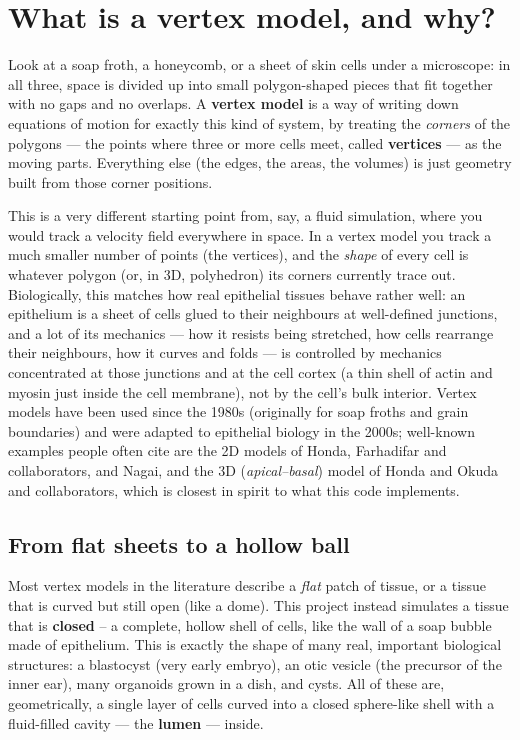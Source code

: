 \documentclass[11pt,a4paper]{report}
\begin{document}
\section{What is a vertex model, and why?}

Look at a soap froth, a honeycomb, or a sheet of skin cells under a
microscope: in all three, space is divided up into small polygon-shaped
pieces that fit together with no gaps and no overlaps. A \textbf{vertex
model} is a way of writing down equations of motion for exactly this
kind of system, by treating the \emph{corners} of the polygons --- the
points where three or more cells meet, called \textbf{vertices} --- as
the moving parts. Everything else (the edges, the areas, the volumes)
is just geometry built from those corner positions.

This is a very different starting point from, say, a fluid simulation,
where you would track a velocity field everywhere in space. In a vertex
model you track a much smaller number of points (the vertices), and the
\emph{shape} of every cell is whatever polygon (or, in 3D, polyhedron)
its corners currently trace out. Biologically, this matches how real
epithelial tissues behave rather well: an epithelium is a sheet of
cells glued to their neighbours at well-defined junctions, and a lot of
its mechanics --- how it resists being stretched, how cells rearrange
their neighbours, how it curves and folds --- is controlled by
mechanics concentrated at those junctions and at the cell cortex
(a thin shell of actin and myosin just inside the cell membrane), not by
the cell's bulk interior. Vertex models have been used since the 1980s
(originally for soap froths and grain boundaries) and were adapted to
epithelial biology in the 2000s; well-known examples people often cite
are the 2D models of Honda, Farhadifar and collaborators, and Nagai,
and the 3D (\emph{apical--basal}) model of Honda and Okuda and
collaborators, which is closest in spirit to what this code implements.

\subsection*{From flat sheets to a hollow ball}

Most vertex models in the literature describe a \emph{flat} patch of
tissue, or a tissue that is curved but still open (like a dome). This
project instead simulates a tissue that is \textbf{closed} -- a
complete, hollow shell of cells, like the wall of a soap bubble made of
epithelium. This is exactly the shape of many real, important biological
structures: a blastocyst (very early embryo), an otic vesicle (the
precursor of the inner ear), many organoids grown in a dish, and
cysts. All of these are, geometrically, a single layer of cells curved
into a closed sphere-like shell with a fluid-filled cavity --- the
\textbf{lumen} --- inside.
\end{document}
